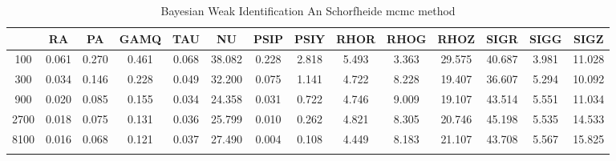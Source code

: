\documentclass[a4paper,10pt]{article}
\begin{document}
\centering
\begin{longtable}{cccccccccccccc}
\toprule
 & RA & PA & GAMQ & TAU & NU & PSIP & PSIY & RHOR & RHOG & RHOZ & SIGR & SIGG & SIGZ \\
\midrule
100 & 0.061 & 0.270 & 0.461 & 0.068 & 38.082 & 0.228 & 2.818 & 5.493 & 3.363 & 29.575 & 40.687 & 3.981 & 11.028 \\
300 & 0.034 & 0.146 & 0.228 & 0.049 & 32.200 & 0.075 & 1.141 & 4.722 & 8.228 & 19.407 & 36.607 & 5.294 & 10.092 \\
900 & 0.020 & 0.085 & 0.155 & 0.034 & 24.358 & 0.031 & 0.722 & 4.746 & 9.009 & 19.107 & 43.514 & 5.551 & 11.034 \\
2700 & 0.018 & 0.075 & 0.131 & 0.036 & 25.799 & 0.010 & 0.262 & 4.821 & 8.305 & 20.746 & 45.198 & 5.535 & 14.533 \\
8100 & 0.016 & 0.068 & 0.121 & 0.037 & 27.490 & 0.004 & 0.108 & 4.449 & 8.183 & 21.107 & 43.708 & 5.567 & 15.825 \\
\bottomrule
\caption{Bayesian Weak Identification An Schorfheide mcmc method}
\label{table:tbl:WeakAnScho_mcmc}
\end{longtable}
\end{document}
